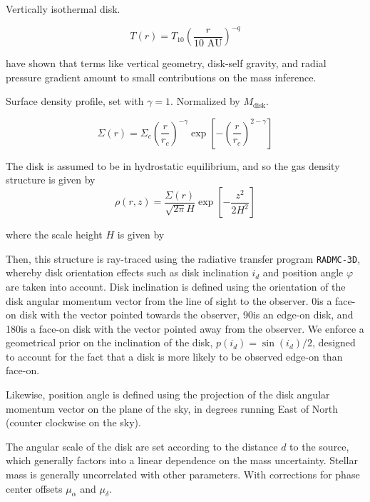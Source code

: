 \documentclass[twocolumn]{aastex6}
\begin{document}
Vertically isothermal disk.

\begin{equation}
	T(r) = T_{10} \left ( \frac{r}{\textrm{10 AU}}\right)^{-q}
\end{equation}

\citet{rosenfeld13a} have shown that terms like vertical geometry, disk-self gravity, and radial pressure gradient amount to small contributions on the mass inference.

Surface density profile, set with $\gamma = 1$. Normalized by $M_\textrm{disk}$.

\begin{equation}
\Sigma(r) = \Sigma_c \left (\frac{r}{r_c} \right)^{- \gamma} \exp \left[ - \left(\frac{r}{r_c} \right)^{2 - \gamma} \right]
\end{equation}

The disk is assumed to be in hydrostatic equilibrium, and so the gas density structure is given by
\begin{equation}
\rho(r, z) = \frac{\Sigma(r)}{\sqrt{2 \pi} H} \exp \left [- \frac{z^2}{2 H^2} \right]
\end{equation}

where the scale height $H$ is given by


Then, this structure is ray-traced using the radiative transfer program \texttt{RADMC-3D}, whereby disk orientation effects such as disk inclination $i_d$ and position angle $\varphi$ are taken into account. Disk inclination is defined using the orientation of the disk angular momentum vector from the line of sight to the observer. 0\degr is a face-on disk with the vector pointed towards the observer, 90\degr is an edge-on disk, and 180\degr is a face-on disk with the vector pointed away from the observer. We enforce a geometrical prior on the inclination of the disk, $p(i_d) =  \sin(i_d)/2$, designed to account for the fact that a disk is more likely to be observed edge-on than face-on.

Likewise, position angle is defined using the projection of the disk angular momentum vector on the plane of the sky, in degrees running East of North (counter clockwise on the sky).

The angular scale of the disk are set according to the distance $d$ to the source, which generally factors into a linear dependence on the mass uncertainty. Stellar mass is generally uncorrelated with other parameters. With corrections for phase center offsets $\mu_\alpha$ and $\mu_\delta$.
\end{document}
